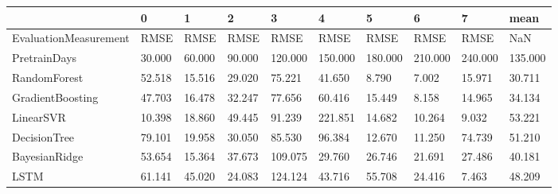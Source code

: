 \begin{tabular}{llllllllll}
\toprule
{} &      0 &      1 &      2 &       3 &       4 &       5 &       6 &       7 &    mean \\
\midrule
EvaluationMeasurement &   RMSE &   RMSE &   RMSE &    RMSE &    RMSE &    RMSE &    RMSE &    RMSE &     NaN \\
PretrainDays          & 30.000 & 60.000 & 90.000 & 120.000 & 150.000 & 180.000 & 210.000 & 240.000 & 135.000 \\
RandomForest          & 52.518 & 15.516 & 29.020 &  75.221 &  41.650 &   8.790 &   7.002 &  15.971 &  30.711 \\
GradientBoosting      & 47.703 & 16.478 & 32.247 &  77.656 &  60.416 &  15.449 &   8.158 &  14.965 &  34.134 \\
LinearSVR             & 10.398 & 18.860 & 49.445 &  91.239 & 221.851 &  14.682 &  10.264 &   9.032 &  53.221 \\
DecisionTree          & 79.101 & 19.958 & 30.050 &  85.530 &  96.384 &  12.670 &  11.250 &  74.739 &  51.210 \\
BayesianRidge         & 53.654 & 15.364 & 37.673 & 109.075 &  29.760 &  26.746 &  21.691 &  27.486 &  40.181 \\
LSTM                  & 61.141 & 45.020 & 24.083 & 124.124 &  43.716 &  55.708 &  24.416 &   7.463 &  48.209 \\
\bottomrule
\end{tabular}
